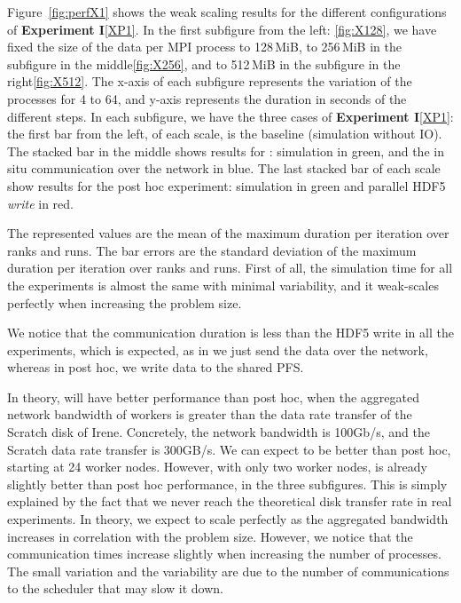 Figure~\ref{fig:perfX1} shows the weak scaling results for the different configurations of \textbf{Experiment I}\ref{XP1}. In the first subfigure from the left: \ref{fig:X128}, we have fixed the size of the data per MPI process to 128\,MiB, to 256\,MiB in the subfigure in the middle\ref{fig:X256}, and to 512\,MiB in the subfigure in the right\ref{fig:X512}. 
The x-axis of each subfigure represents the variation of the processes for 4 to 64, and y-axis represents the duration in seconds of the different steps.
In each subfigure, we have the three cases of \textbf{Experiment I}\ref{XP1}: the first bar from the left, of each scale,  is the baseline (simulation without IO). 
The stacked bar in the middle shows results for \deisa: simulation in green, and the in situ communication over the network in blue. The last stacked bar of each scale show results for the post hoc experiment: simulation in green and parallel HDF5 \textit{write} in red.

The represented values are the mean of the maximum duration per iteration over ranks and runs. The bar errors are the standard deviation of the maximum duration per iteration over ranks and runs. 
First of all, the simulation time for all the experiments is almost the same with minimal variability, and it weak-scales perfectly when increasing the problem size.

We notice that the \deisa communication duration is less than the HDF5 write in all the experiments, which is expected, as in \deisa we just send the data over the network, whereas in post hoc, we write data to the shared PFS. 

In theory, \deisa will have better performance than post hoc,  when the aggregated network bandwidth of \dask workers is greater than the data rate transfer of the Scratch disk of Irene. Concretely, the network bandwidth is 100Gb/s, and the Scratch data rate transfer is 300GB/s. We can expect to be better than post hoc, starting at 24 worker nodes.
However, with only two worker nodes, \deisa is already slightly better than post hoc performance, in the three subfigures. This is simply explained by the fact that we never reach the theoretical disk transfer rate in real experiments.
In theory, we expect \deisa to scale perfectly as the aggregated bandwidth increases in correlation with the problem size. However, we notice that the \deisa communication times increase slightly when increasing the number of processes. 
The small variation and the variability are due to the number of communications to the \dask scheduler that may slow it down.  

